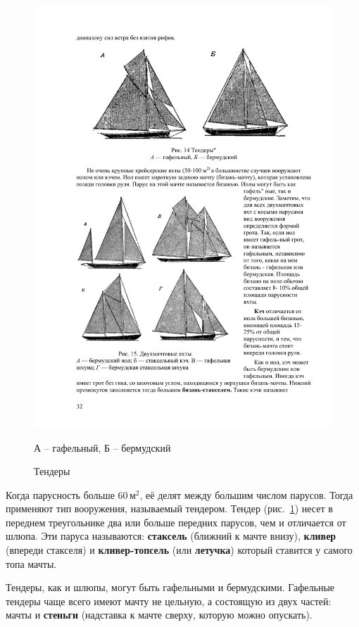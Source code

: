 \documentclass[a4paper, 12pt, twoside, final]{scrbook}
\begin{document}
\begin{figure}[htbp]
	\centering
	\includegraphics{pics/Tendery}
	\protect\caption{\label{fig:14}Тендеры}
	\centering\small А \--- гафельный, Б \--- бермудский
\end{figure}


Когда парусность больше 60\,$\mbox{м}^2$, её делят между большим числом
парусов. Тогда применяют тип вооружения, называемый тендером. Тендер
(рис.~\ref{fig:14})
несет в переднем треугольнике два или больше передних парусов, чем
и отличается от шлюпа. Эти паруса называются: \textbf{стаксель} (ближний
к мачте внизу), \textbf{кливер} (впереди стакселя) и \textbf{кливер-топсель}
(или \textbf{летучка}) который ставится у самого топа мачты.

Тендеры, как и шлюпы, могут быть гафельными и бермудскими. Гафельные
тендеры чаще всего имеют мачту не цельную, а состоящую из двух частей:
мачты и \textbf{стеньги} (надставка к мачте сверху, которую можно
опускать).
\end{document}
